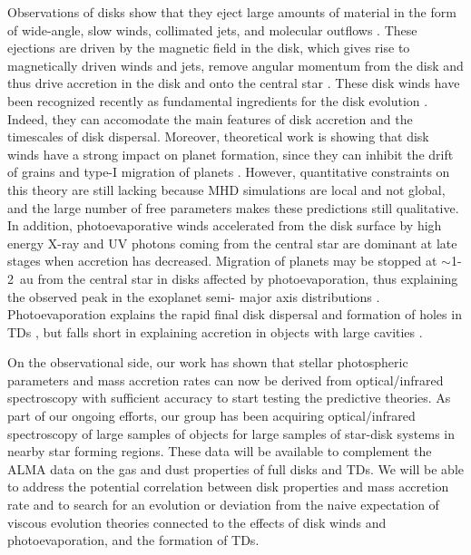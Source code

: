 \documentclass[10pt,fleqn,twoside]{article}
\begin{document}
Observations of disks show that they eject large amounts of material in the form of wide-angle, 
slow winds, collimated jets, and molecular outflows \citep[e.g.\ ][]{2014prpl.conf..451F}. 
These ejections are driven by the magnetic field in the disk, which gives 
rise to magnetically driven winds and jets, remove angular momentum from the disk and thus 
drive accretion in the disk and onto the central star \citep{2007prpl.conf..277P}. 
These disk winds have been recognized recently as fundamental ingredients for the disk 
evolution \citep{2013ApJ...778L..14A,2016ApJ...818..152B}. Indeed, they can accomodate the main features 
of disk 
accretion and the timescales of disk dispersal. Moreover, theoretical work is showing that 
disk winds have a strong impact on planet formation, since they can inhibit the drift of 
grains and type-I migration of planets \citep{2016A&A...596A..74S}. However, 
quantitative constraints on this theory are still lacking because MHD simulations are 
local and not global, and the large number of free parameters makes these predictions 
still qualitative. In addition, photoevaporative winds accelerated from the disk surface 
by high energy X-ray and UV photons coming from the central star are dominant at late 
stages when accretion has decreased. Migration of planets may be stopped at $\sim$1-2~au 
from the central star in disks affected by photoevaporation, thus explaining the observed 
peak in the exoplanet semi- major axis distributions \citep{2012MNRAS.422L..82A,2015MNRAS.450.3008E}. Photoevaporation explains the rapid final disk dispersal 
and formation of holes in TDs \citep{2014prpl.conf..475A}, but falls short in explaining 
accretion in objects with large cavities \citep{2012MNRAS.426L..96O}.

On the observational side, our work \citep{2016A&A...591L...3M} has shown that stellar photospheric parameters and mass accretion rates can now be derived from optical/infrared spectroscopy with sufficient 
accuracy to start testing the predictive theories. As part of our ongoing efforts, our group has 
been acquiring optical/infrared spectroscopy of large samples of objects for large samples of 
star-disk systems in nearby star forming regions. These data will be available to complement the 
ALMA data on the gas and dust properties of full disks and TDs. We will be able to address the 
potential correlation between disk properties and mass accretion rate and to search for an 
evolution or deviation from the naive expectation of viscous evolution theories connected to the 
effects of disk winds and photoevaporation, and the formation of TDs.
\end{document}
